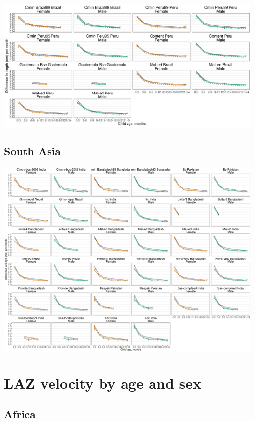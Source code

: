 \documentclass[
  9pt,
]{book}
\begin{document}
\includegraphics[width=50in]{figures//stunting/fig-stunt-2-vel-cohort-latamer-allage-primary}

\hypertarget{south-asia-3}{%
\subsection{South Asia}\label{south-asia-3}}

\includegraphics[width=66.67in]{figures//stunting/fig-stunt-2-vel-cohort-asia-allage-primary}

\hypertarget{laz-velocity-by-age-and-sex}{%
\section{LAZ velocity by age and sex}\label{laz-velocity-by-age-and-sex}}

\hypertarget{africa-4}{%
\subsection{Africa}\label{africa-4}}
\end{document}
